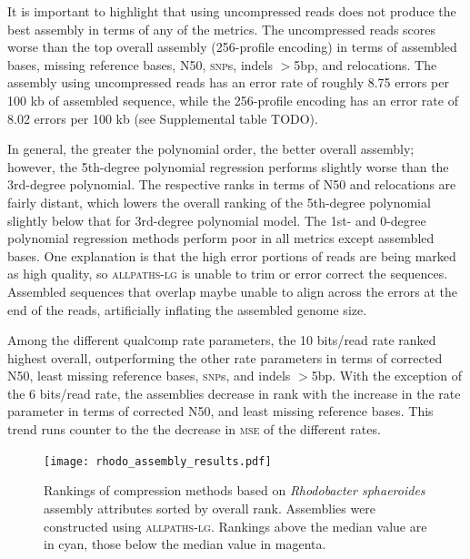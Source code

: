 It is important to highlight that using uncompressed reads does not
produce the best assembly in terms of any of the metrics. The
uncompressed reads scores worse than the top overall assembly
(256-profile encoding) in terms of assembled bases, missing reference
bases, N50, \textsc{snp}s, indels $>$5bp, and relocations. The
assembly using uncompressed reads has an error rate of roughly 8.75
errors per 100 kb of assembled sequence, while the 256-profile
encoding has an error rate of 8.02 errors per 100 kb (see Supplemental
table TODO).

In general, the greater the polynomial order, the better overall
assembly; however, the 5th-degree polynomial regression performs
slightly worse than the 3rd-degree polynomial. The respective ranks in
terms of N50 and relocations are fairly distant, which lowers the
overall ranking of the 5th-degree polynomial slightly below that for
3rd-degree polynomial model. The 1st- and 0-degree polynomial
regression methods perform poor in all metrics except assembled bases.
One explanation is that the high error portions of reads are being
marked as high quality, so \textsc{allpaths-lg} is unable to trim or
error correct the sequences. Assembled sequences that overlap maybe
unable to align across the errors at the end of the reads, artificially
inflating the assembled genome size.

Among the different \textsc{q}ual\textsc{c}omp rate parameters, the 10 bits/read rate
ranked highest overall, outperforming the other rate parameters in
terms of corrected N50, least missing reference bases, \textsc{snp}s,
and indels $>$5bp. With the exception of the 6 bits/read rate, the
assemblies decrease in rank with the increase in the rate parameter in
terms of corrected N50, and least missing reference bases. This trend
runs counter to the the decrease in \textsc{mse} of the different
rates.


\begin{figure}[!htb]%
\begin{center}
\texttt{[image: rhodo\_assembly\_results.pdf]}
\end{center}
\renewcommand{\baselinestretch}{1}
\small\normalsize
\begin{quote}
\caption[Rankings of compression methods based on \textit{Rhodobacter
    sphaeroides} assembly attributes]{Rankings of compression methods based on \textit{Rhodobacter
    sphaeroides} assembly attributes sorted by overall
  rank. Assemblies were constructed using \textsc{allpaths-lg}.
  Rankings above the median value are in cyan, those below the median
  value in magenta.}
  \label{fig:assembly_ranks}
\end{quote}
\end{figure}
\renewcommand{\baselinestretch}{2}
\small\normalsize


